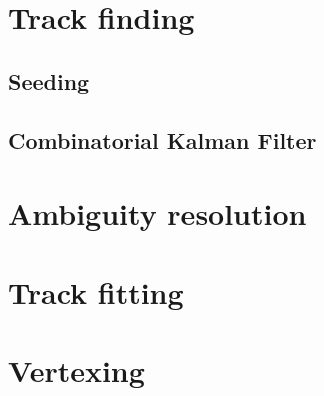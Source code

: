 
\section{Track finding}

\subsection{Seeding}


\subsection{Combinatorial Kalman Filter}


\section{Ambiguity resolution}

\section{Track fitting}


\section{Vertexing}
